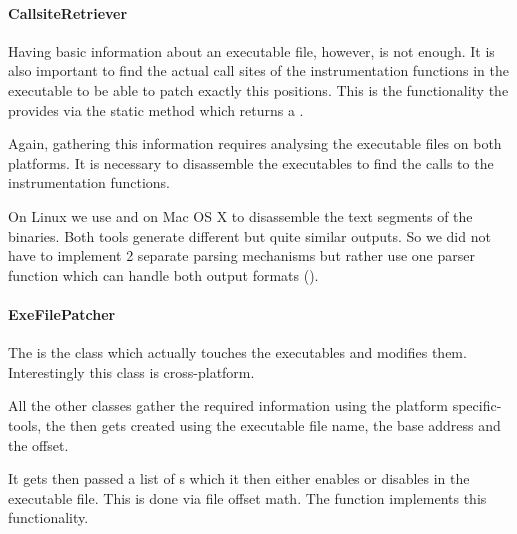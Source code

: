 \paragraph{CallsiteRetriever}

Having basic information about an executable file, however, is not enough.  It is also important to find the actual call sites of the instrumentation functions in the executable to be able to patch exactly this positions.  This is the functionality the  provides via the static method  which returns a .

Again, gathering this information requires analysing the executable files on both platforms.  It is necessary to disassemble the executables to find the calls to the instrumentation functions.

On Linux we use  and on Mac OS X  to disassemble the text segments of the binaries.  Both tools generate different but quite similar outputs.  So we did not have to implement 2 separate parsing mechanisms but rather use one parser function which can handle both output formats ().

\paragraph{ExeFilePatcher}

The  is the class which actually touches the executables and modifies them.  Interestingly this class is cross-platform.

All the other classes gather the required information using the platform specific-tools, the  then gets created using the executable file name, the base address and the offset.

It gets then passed a list of s which it then either enables or disables in the executable file.  This is done via file offset math.
The function  implements this functionality.

% 
% 
% 




